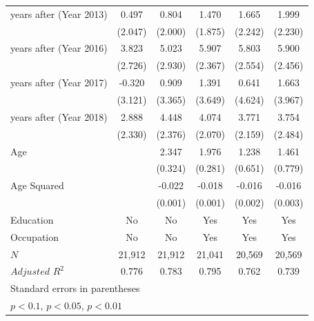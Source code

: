 \documentclass[serif, aspectratio=169]{beamer}
\begin{document}
\begin{frame}
\begin{table}[htbp]
\begin{tabular}{@{\extracolsep{5pt}}lccccc}
\addlinespace
2 years after (Year 2013)&       0.497         &       0.804         &       1.470         &       1.665         &       1.999         \\
            &     (2.047)         &     (2.000)         &     (1.875)         &     (2.242)         &     (2.230)         \\
\addlinespace
5 years after (Year 2016)&       3.823         &       5.023\sym{*}  &       5.907\sym{**} &       5.803\sym{**} &       5.900\sym{**} \\
            &     (2.726)         &     (2.930)         &     (2.367)         &     (2.554)         &     (2.456)         \\
\addlinespace
6 years after (Year 2017)&      -0.320         &       0.909         &       1.391         &       0.641         &       1.663         \\
            &     (3.121)         &     (3.365)         &     (3.649)         &     (4.624)         &     (3.967)         \\
\addlinespace
7 years after (Year 2018)&       2.888         &       4.448\sym{*}  &       4.074\sym{*}  &       3.771\sym{*}  &       3.754         \\
            &     (2.330)         &     (2.376)         &     (2.070)         &     (2.159)         &     (2.484)         \\
\addlinespace
Age         &                     &       2.347\sym{***}&       1.976\sym{***}&       1.238\sym{*}  &       1.461\sym{*}  \\
            &                     &     (0.324)         &     (0.281)         &     (0.651)         &     (0.779)         \\
\addlinespace
Age Squared &                     &      -0.022\sym{***}&      -0.018\sym{***}&      -0.016\sym{***}&      -0.016\sym{***}\\
            &                     &     (0.001)         &     (0.001)         &     (0.002)         &     (0.003)         \\
\midrule
Education   &          No         &          No         &         Yes         &         Yes         &         Yes         \\
Occupation  &          No         &          No         &         Yes         &         Yes         &         Yes         \\
$\textit{N}$&      21,912         &      21,912         &      21,041         &      20,569         &      20,569         \\
$\textit{Adjusted R}^2$&       0.776         &       0.783         &       0.795         &       0.762         &       0.739         \\
\bottomrule
\multicolumn{6}{l}{\tiny Standard errors in parentheses}\\
\multicolumn{6}{l}{\tiny \sym{*} \(p<0.1\), \sym{**} \(p<0.05\), \sym{***} \(p<0.01\)}\\



\end{tabular}
\end{table}
\end{frame}
\end{document}
